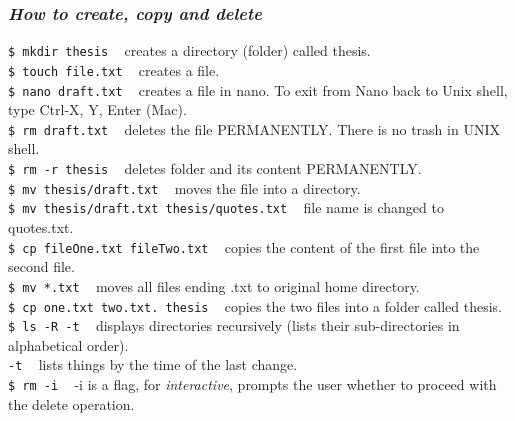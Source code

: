 \documentclass{article}
\begin{document}
\subsubsection{\small\textsl{How to create, copy and delete}}
\texttt{\$ mkdir thesis} ~ creates a directory (folder) called thesis.\\
\texttt{\$ touch file.txt} ~	creates a file.\\
\texttt{\$ nano draft.txt} ~	creates a file in nano. To exit from Nano back to Unix shell, type Ctrl-X, Y, Enter (Mac).\\
\texttt{\$ rm draft.txt} ~ deletes the file PERMANENTLY. There is no trash in UNIX shell.\\
\texttt{\$ rm -r thesis} ~ deletes folder and its content PERMANENTLY.\\
\texttt{\$ mv thesis/draft.txt} ~	moves the file into a directory.\\
\texttt{\$ mv thesis/draft.txt thesis/quotes.txt} ~  file name is changed to quotes.txt. \\
\texttt{\$ cp fileOne.txt fileTwo.txt} ~	copies the content of the first file into the second file.\\
\texttt{\$ mv *.txt} ~	moves all files ending .txt to original home directory.\\
\texttt{\$ cp one.txt two.txt. thesis} ~ copies the two files into a folder called thesis.\\
\texttt{\$ ls -R -t} ~ displays directories recursively (lists their sub-directories in  alphabetical order).\\
\texttt{-t} ~ lists things by the time of the last change.\\
\texttt{\$ rm -i} ~  -i is a flag, for \textit{interactive}, prompts the user whether to proceed with the delete operation.\\
\end{document}
